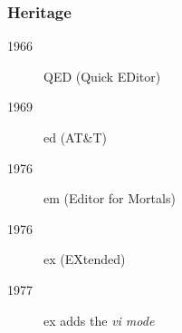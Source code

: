 \begin{frame}[fragile]
  \frametitle{Heritage}
  \begin{description}
    \item[1966] QED (Quick EDitor)
    \item[1969] ed (AT\&T)
    \item[1976] em (Editor for Mortals)
    \item[1976] ex (EXtended)
    \item[1977] ex adds the \textit{vi mode}
  \end{description}
\end{frame}
